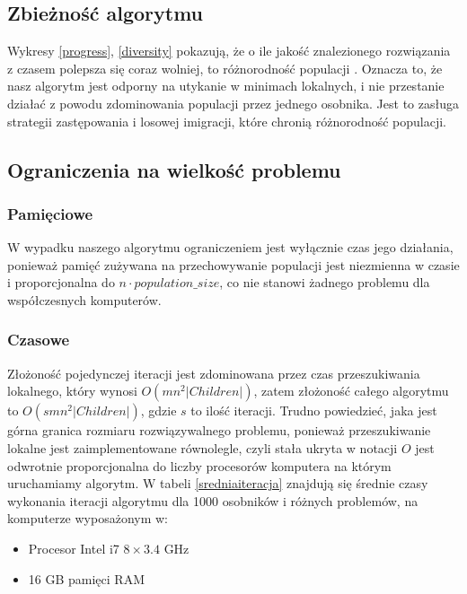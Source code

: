 \documentclass[11pt, a4wide]{article}
\begin{document}
\subsection{Zbieżność algorytmu}
Wykresy \ref{progress}, \ref{diversity} pokazują, że o ile jakość znalezionego rozwiązania z czasem polepsza się 
coraz wolniej, to różnorodność populacji . Oznacza to, że nasz algorytm jest odporny na utykanie
w minimach lokalnych, i nie przestanie działać z powodu zdominowania populacji przez jednego osobnika. Jest to
zasługa strategii zastępowania i losowej imigracji, które chronią różnorodność populacji.

\subsection{Ograniczenia na wielkość problemu}
\subsubsection{Pamięciowe}
W wypadku naszego algorytmu ograniczeniem jest wyłącznie czas jego działania, ponieważ
pamięć zużywana na przechowywanie populacji jest niezmienna w czasie i proporcjonalna do
$n \cdot population\_size$, co nie stanowi żadnego problemu dla współczesnych komputerów.
\subsubsection{Czasowe}
Złożoność pojedynczej iteracji jest zdominowana przez czas przeszukiwania lokalnego, który wynosi
$O(mn^2|Children|)$, zatem złożoność całego algorytmu to $O(smn^2|Children|)$, gdzie $s$ to ilość iteracji.
Trudno powiedzieć, jaka jest górna granica rozmiaru rozwiązywalnego problemu, ponieważ przeszukiwanie 
lokalne jest zaimplementowane równolegle, czyli stała ukryta w notacji $O$ jest odwrotnie proporcjonalna
do liczby procesorów komputera na którym uruchamiamy algorytm. W tabeli \ref{sredniaiteracja} znajdują się 
średnie czasy wykonania iteracji algorytmu dla 1000 osobników i różnych problemów, na komputerze wyposażonym w:
\begin{itemize}
  \item Procesor Intel i7 $8 \times \text{3.4 GHz}$
  \item 16 GB pamięci RAM
\end{itemize}
\end{document}
